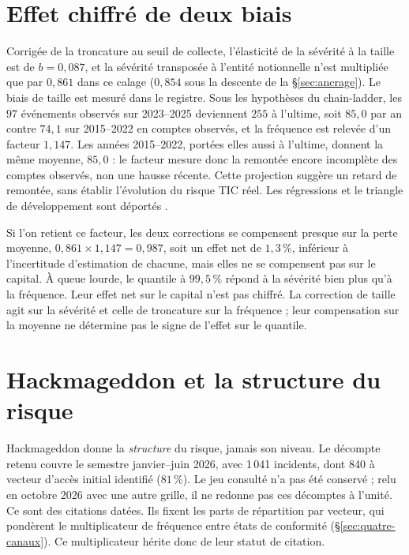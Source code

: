 \section{Effet chiffré de deux biais}
\label{sec:biais-chiffres}

Corrigée de la troncature au seuil de collecte, l'élasticité de la sévérité à la taille est de
$b=0{,}087$, et la sévérité transposée à l'entité notionnelle n'est multipliée que par $0{,}861$ dans ce calage ($0{,}854$ sous la descente de la \S\ref{sec:ancrage}). Le
biais de taille est mesuré dans le registre. Sous les hypothèses du chain-ladder, les $97$ événements observés sur 2023--2025 deviennent $255$ à l'ultime, soit $85{,}0$ par an contre $74{,}1$ sur 2015--2022 en comptes observés, et la fréquence est relevée d'un facteur $1{,}147$. Les années 2015--2022, portées elles aussi à l'ultime, donnent la même moyenne, $85{,}0$ : le facteur mesure donc la remontée encore incomplète des comptes observés, non une hausse récente. Cette projection suggère un retard de
remontée, sans établir l'évolution du risque TIC réel. Les régressions et le triangle de
développement sont déportés \matcomp.

Si l'on retient ce facteur, les deux corrections se compensent presque sur la perte moyenne, $0{,}861\times1{,}147=0{,}987$, soit
un effet net de $1{,}3\,\%$, inférieur à l'incertitude d'estimation de chacune, mais elles ne se compensent pas sur le capital. À queue lourde, le quantile à $99{,}5\,\%$ répond à la sévérité bien plus qu'à la fréquence. Leur effet net sur le capital n'est pas chiffré. La correction de taille agit sur la sévérité et celle de troncature sur la fréquence ; leur compensation sur la moyenne ne détermine pas le signe de l'effet sur le quantile.

\section{Hackmageddon et la structure du risque}
\label{sec:hackmageddon}

Hackmageddon donne la \emph{structure} du risque, jamais son niveau. Le décompte retenu couvre le
semestre janvier--juin 2026, avec 1\,041 incidents, dont 840 à vecteur d'accès initial identifié
($81\,\%$). Le jeu consulté n'a pas été conservé ; relu en octobre 2026 avec une autre grille, il ne redonne pas ces décomptes à l'unité. Ce sont des citations datées. Ils fixent les parts de répartition par vecteur, qui pondèrent le
multiplicateur de fréquence entre états de conformité (\S\ref{sec:quatre-canaux}). Ce
multiplicateur hérite donc de leur statut de citation.


